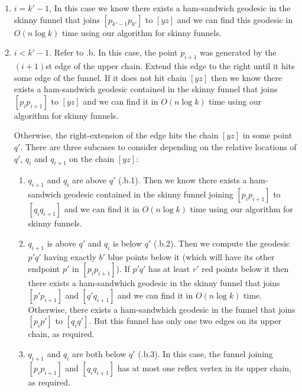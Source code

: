 \documentclass[charterfonts,lotsofwhite]{patmorin}
\newcommand{\chain}[2]{[#1#2]}
\begin{document}
\begin{enumerate}

\item $i=k'-1$, In this case we know there exists a ham-sandwich
geodesic in the skinny funnel that joins $\chain{p_{k'-1}}{p_{k'}}$ to
$\chain{y}{z}$ and we can find this geodesic in $O(n\log k)$ time using
our algorithm for skinny funnels.

\item $i < k'-1$.  Refer to .b. In this case, the
point $p_{i+1}$ was generated by the $(i+1)$st edge of the upper chain.
Extend this edge to the right until it hits some edge of the funnel.
If it does not hit chain $\chain{y}{z}$ then we know there exists a
ham-sandwich geodesic contained in the skinny funnel that joins
$\chain{p_{i}}{p_{i+1}}$ to $\chain{y}{z}$ and we can find it in $O(n\log
k)$ time using our algorithm for skinny funnels.  

Otherwise, the right-extension of the edge hits the chain
$\chain{y}{z}$ in some point $q'$.  There are three subcases to
consider depending on the relative locations of $q'$, $q_i$ and
$q_{i+1}$ on the chain $\chain{y}{z}$:

\begin{enumerate}

\item $q_{i+1}$ and $q_i$ are above $q'$
(.b.1).  Then we know there exists
a ham-sandwich geodesic contained in the skinny funnel joining
$\chain{p_i}{p_{i+1}}$ to $\chain{q_i}{q_{i+1}}$ and we can find it in $O(
n\log k)$ time using our algorithm for skinny funnels.

\item $q_{i+1}$ is above $q'$ and $q_i$ is below $q'$
(.b.2).  Then we compute the geodesic $p'q'$
having exactly $b'$ blue points below it (which will have its other
endpoint $p'$ in $\chain{p_{i}}{p_{i+1}}$).  If $p'q'$ has at least
$r'$ red points below it then there exists a ham-sandwhich geodesic in
the skinny funnel that joins $\chain{p'}{p_{i+1}}$ and
$\chain{q'}{q_{i+1}}$ and we can find it in $O(n\log k)$ time.
Otherwise, there exists a ham-sandwhich geodesic in the funnel that
joins $\chain{p_i}{p'}$ to $\chain{q_i}{q'}$.  But this funnel has
only one two edges on its upper chain, as required.

\item $q_{i+1}$ and $q_{i}$ are both below $q'$
(.b.3).  In this case, the funnel joining
$\chain{p_i}{p_{i+1}}$ and $\chain{q_i}{q_{i+1}}$ has at most one reflex
vertex in its upper chain, as required.
\end{enumerate}

\end{enumerate}
\end{document}
